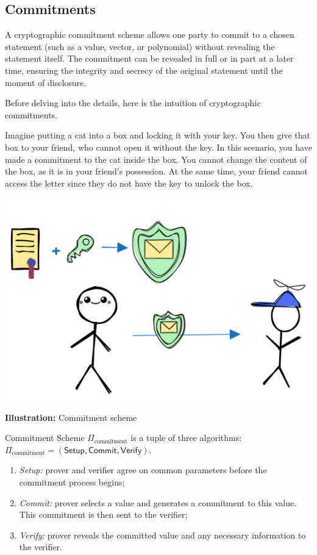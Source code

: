 \documentclass[../lecture-notes.tex]{subfiles}
\begin{document}
\subsection{Commitments}

\begin{definition}
    A cryptographic commitment scheme allows one party to commit to a chosen statement (such as a value, vector, or polynomial) without revealing the statement itself. The commitment can be revealed in full or in part at a later time, ensuring the integrity and secrecy of the original statement until the moment of disclosure.
\end{definition}

Before delving into the details, here is the intuition of cryptographic commitments.

Imagine putting a cat into a box and locking it with your key. 
You then give that box to your friend, who cannot open it without the key.
In this scenario, you have made a commitment to the cat inside the box. 
You cannot change the content of the box, as it is in your friend's possession. 
At the same time, your friend cannot access the letter since they do not have the key to unlock the box.

\begin{center}
    \centering\includegraphics[width=0.5\linewidth, clip]{images/lecture_5/CommitmentExample.png}

    \scriptsize{\textbf{Illustration:} Commitment scheme}
\end{center}

\begin{definition}
    
    Commitment Scheme $\Pi_{\text{commitment}}$ is a tuple of three algorithms: $\Pi_{\text{commitment}} = (\mathsf{Setup}, \mathsf{Commit}, \mathsf{Verify})$.
     
    \begin{enumerate}

        \item \textit{Setup:}  prover and verifier agree on common parameters before the commitment process begins;

        \item \textit{Commit:} prover selects a value and generates a commitment to this value. This commitment is then sent to the verifier;

        \item  \textit{Verify:} prover reveals the committed value and any necessary information to the verifier. 
    \end{enumerate}
\end{definition}
\end{document}

